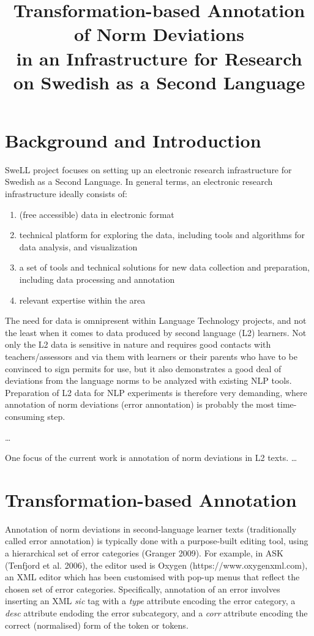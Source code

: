\documentclass[10pt, a4paper]{article}
\title{Transformation-based Annotation of Norm Deviations \\ in an Infrastructure for Research on Swedish as a Second Language}
\begin{document}
\maketitleabstract

\section{Background and Introduction}

SweLL project focuses on setting up an electronic research infrastructure for Swedish as a Second Language. In general terms, an electronic research infrastructure ideally consists of:
\begin{enumerate}
\item  (free accessible) data in electronic format
\item  technical platform for exploring the data, including tools and algorithms for data analysis,  and visualization
\item a set of tools and technical solutions for new data collection and preparation, including data processing and annotation
\item  relevant expertise within the area
\end{enumerate}


The need for data is omnipresent within Language Technology projects, and not the least when it comes to data produced by second language (L2) learners. Not only the L2 data is sensitive in nature and requires good contacts with teachers/assessors and via them with learners or their parents who have to be convinced to sign permits for use, but it also demonstrates a good deal of deviations from the language norms to be analyzed with existing NLP tools. Preparation of L2 data for NLP experiments is therefore very demanding, where annotation of norm deviations (error annontation) is probably the most time-consuming step. 

 \ldots
 
One focus of the current work is annotation of norm deviations in L2 texts. \ldots

\section{Transformation-based Annotation}

Annotation of norm deviations in second-language learner texts (traditionally called error annotation) is typically done with a purpose-built editing tool, using a hierarchical set of error categories (Granger 2009). For example, in ASK (Tenfjord et al. 2006), the editor used is Oxygen (https://www.oxygenxml.com), an XML editor which has been customised with pop-up menus that reflect the chosen set of error categories. Specifically, annotation of an error involves inserting an XML {\em sic} tag with a {\em type} attribute encoding the error category, a {\em desc} attribute endoding the error subcategory, and a {\em corr} attribute encoding the correct (normalised) form of the token or tokens.
\end{document}
